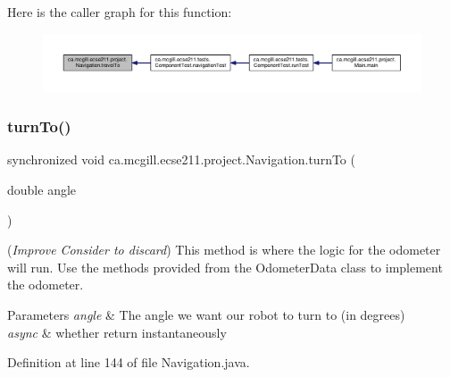 Here is the caller graph for this function\+:\nopagebreak
\begin{figure}[H]
\begin{center}
\leavevmode
\includegraphics[width=350pt]{classca_1_1mcgill_1_1ecse211_1_1project_1_1_navigation_ada8a324c1d391698164476d4d728f0c4_icgraph}
\end{center}
\end{figure}
\mbox{\label{classca_1_1mcgill_1_1ecse211_1_1project_1_1_navigation_a3bbe0645f2b3b3d0986b4a707fb5a00c}} 
\subsubsection{\texorpdfstring{turn\+To()}{turnTo()}}
{\footnotesize\ttfamily synchronized void ca.\+mcgill.\+ecse211.\+project.\+Navigation.\+turn\+To (\begin{DoxyParamCaption}\item[{double}]{angle }\end{DoxyParamCaption})}

({\itshape Improve} {\itshape Consider to discard}) This method is where the logic for the odometer will run. Use the methods provided from the Odometer\+Data class to implement the odometer.


\begin{DoxyParams}{Parameters}
{\em angle} & The angle we want our robot to turn to (in degrees) \\
\hline
{\em async} & whether return instantaneously \\
\hline
\end{DoxyParams}


Definition at line 144 of file Navigation.\+java.


